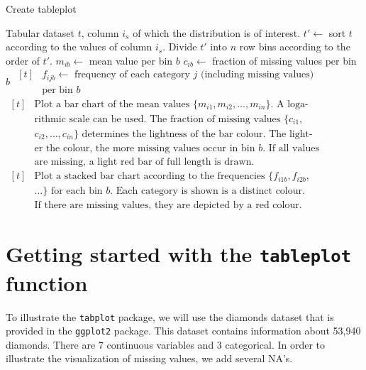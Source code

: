 \documentclass[11pt, fleqn, a4paper]{article}
\begin{document}
\begin{algorithm}[t]
\caption{Create tableplot}\label{alg}
\begin{algorithmic}[1]
\Require Tabular dataset $t$, column $i_{s}$ of which the distribution is of interest.
\State $t'\leftarrow$ sort $t$ according to the values of column $i_s$.
\State Divide $t'$ into $n$ row bins according to the order of $t'$.
\State $m_{ib}\leftarrow$ mean value per bin $b$
\State $c_{ib}\leftarrow$ fraction of missing values per bin $b$
\EndIf
{}
\State $\begin{aligned}[t]
		&\mbox{$f_{ijb}\leftarrow$ frequency of each category $j$ (including missing values)}\\[-3pt]
		&\mbox{per bin $b$}
	\end{aligned}$
\EndIf
\EndFor
{}
\State $\begin{aligned}[t]
		&\mbox{Plot a bar chart of the mean values $\{m_{i1}, m_{i2},\ldots, m_{in}\}$. A loga-}\\[-3pt]
		&\mbox{rithmic scale can be used. The fraction of missing values $\{c_{i1},$}\\[-3pt]
		&\mbox{$c_{i2},\ldots, c_{in}\}$ determines the lightness of the bar colour. The light-}\\[-3pt]
		&\mbox{er the colour, the more missing values occur in bin $b$. If all values}\\[-3pt]
		&\mbox{are missing, a light red bar of full length is drawn.}
	\end{aligned}$
\EndIf
{}
\State $\begin{aligned}[t]
		&\mbox{Plot a stacked bar chart according to the frequencies $\{f_{i1b}, f_{i2b},$}\\[-3pt]
		&\mbox{$\ldots\}$ for each bin $b$. Each category is shown is a distinct colour.}\\[-3pt]
		&\mbox{If there are missing values, they are depicted by a red colour.}
	\end{aligned}$
\EndIf
\EndFor
\end{algorithmic}
\end{algorithm}


\section{Getting started with the {\tt tableplot} function}

To illustrate the {\tt tabplot} package, we will use the diamonds dataset that is provided in the {\tt ggplot2} package. This dataset contains information about 53,940 diamonds. There are 7 continuous variables and 3 categorical. In order to illustrate the visualization of missing values, we add several NA's.
\end{document}
